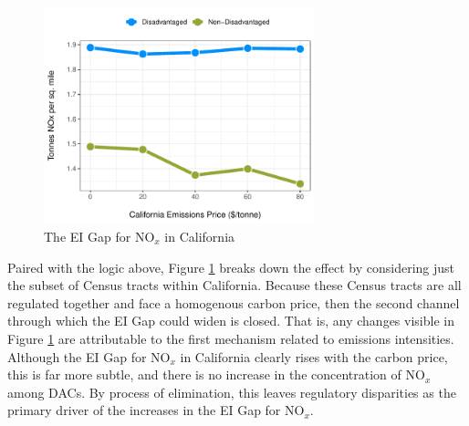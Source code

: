 \begin{figure}
    \centering
    \caption{The EI Gap for NO$_x$ in California \label{ei_gap_bca_nox_cal}}
    \includegraphics[width=0.7\textwidth]{figures/chapter5_figures/ei_gap_bca_nox_cal.pdf}
\end{figure}

Paired with the logic above, Figure \ref{ei_gap_bca_nox_cal} breaks down the effect by considering just the subset of Census tracts within California. Because these Census tracts are all regulated together and face a homogenous carbon price, then the second channel through which the EI Gap could widen is closed. That is, any changes visible in Figure \ref{ei_gap_bca_nox_cal} are attributable to the first mechanism related to emissions intensities. Although the EI Gap for NO$_x$ in California clearly rises with the carbon price, this is far more subtle, and there is no increase in the concentration of NO$_x$ among DACs. By process of elimination, this leaves regulatory disparities as the primary driver of the increases in the EI Gap for NO$_x$. 

